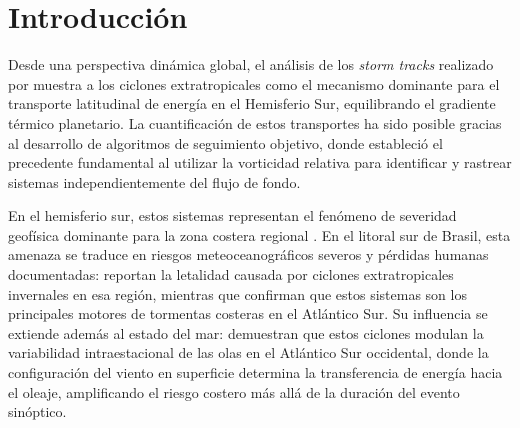 \chapter{Introducción} \label{ch:introduccion}


Desde una perspectiva dinámica global, el análisis de los \emph{storm tracks} realizado por \citet{hoskins2005new} muestra a los ciclones extratropicales como el mecanismo dominante para el transporte latitudinal de energía en el Hemisferio Sur, equilibrando el gradiente térmico planetario. La cuantificación de estos transportes ha sido posible gracias al desarrollo de algoritmos de seguimiento objetivo, donde \citet{sinclair1994objective} estableció el precedente fundamental al utilizar la vorticidad relativa para identificar y rastrear sistemas independientemente del flujo de fondo.

En el hemisferio sur, estos sistemas representan el fenómeno de severidad geofísica dominante para la zona costera regional \citep{gramcianinov2023impact}. En el litoral sur de Brasil, esta amenaza se traduce en riesgos meteoceanográficos severos y pérdidas humanas documentadas: \citet{bartolomei2024extremos} reportan la letalidad causada por ciclones extratropicales invernales en esa región, mientras que \citet{miranda2026patterns} confirman que estos sistemas son los principales motores de tormentas costeras en el Atlántico Sur. Su influencia se extiende además al estado del mar: \citet{sasaki2021intraseasonal} demuestran que estos ciclones modulan la variabilidad intraestacional de las olas en el Atlántico Sur occidental, donde la configuración del viento en superficie determina la transferencia de energía hacia el oleaje, amplificando el riesgo costero más allá de la duración del evento sinóptico.


